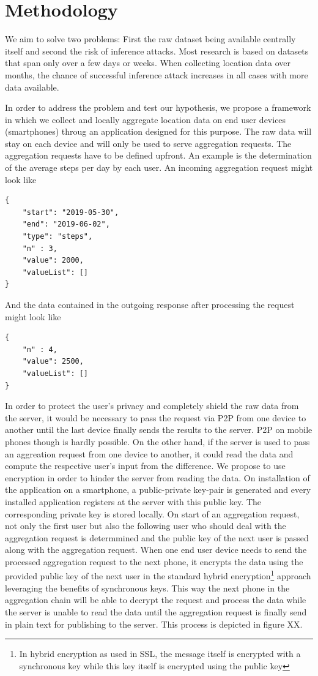 \chapter{Methodology}\label{chapter:method}
We aim to solve two problems: First the raw dataset being available centrally itself and second the risk of inference attacks. Most research is based on datasets that span only over a few days or weeks. When collecting location data over months, the chance of successful inference attack increases in all cases with more data available.

In order to address the problem and test our hypothesis, we propose a framework in which we collect and locally aggregate location data on end user devices (smartphones) throug an application designed for this purpose. The raw data will stay on each device and will only be used to serve aggregation requests. The aggregation requests have to be defined upfront. An example is the determination of the average steps per day by each user. An incoming aggregation request might look like
\begin{verbatim}
{
	"start": "2019-05-30",
	"end": "2019-06-02",
	"type": "steps",
	"n" : 3,
	"value": 2000,
	"valueList": []
}
\end{verbatim}
And the data contained in the outgoing response after processing the request might look like
\begin{verbatim}
{
	"n" : 4,
	"value": 2500,
	"valueList": []
}
\end{verbatim}
 In order to protect the user's privacy and completely shield the raw data from the server, it would be necessary to pass the request via P2P from one device to another until the last device finally sends the results to the server. P2P on mobile phones though is hardly possible. On the other hand, if the server is used to pass an aggreation request from one device to another, it could read the data and compute the respective user's input from the difference. We propose to use encryption in order to hinder the server from reading the data. On installation of the application on a smartphone, a public-private key-pair is generated and every installed application registers at the server with this public key. The corresponding private key is stored locally. On start of an aggregation request, not only the first user but also the following user who should deal with the aggregation request is determmined and the public key of the next user is passed along with the aggregation request. When one end user device needs to send the processed aggregation request to the next phone, it encrypts the data using the provided public key of the next user in the standard hybrid encryption\footnote{In hybrid encryption as used in SSL, the message itself is encrypted with a synchronous key while this key itself is encrypted using the public key} approach leveraging the benefits of synchronous keys. This way the next phone in the aggregation chain will be able to decrypt the request and process the data while the server is unable to read the data until the aggregation request is finally send in plain text for publishing to the server. This process is depicted in figure XX.

